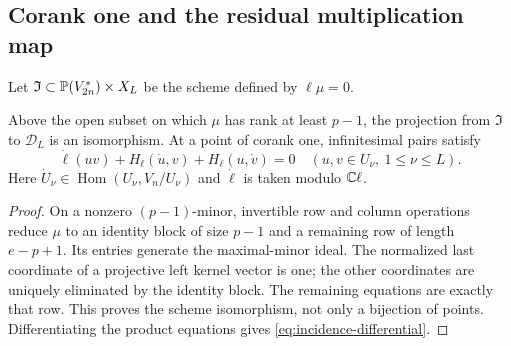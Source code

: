 \subsection{Corank one and the residual multiplication map}
Let $\mathfrak I\subset\mathbb P(V_{2n}^*)\times X_L$ be the scheme defined by $\ell\mu=0$.
\begin{lemma}\label{lem:incidence-chart}
Above the open subset on which $\mu$ has rank at least $p-1$, the projection from $\mathfrak I$ to $\mathscr D_L$ is an isomorphism. At a point of corank one, infinitesimal pairs satisfy
\begin{equation}\label{eq:incidence-differential}
 \dot\ell(uv)+H_\ell(\dot u,v)+H_\ell(u,\dot v)=0
       \quad(u,v\in U_\nu,\ 1\le\nu\le L).
\end{equation}
Here $\dot U_\nu\in\operatorname{Hom}(U_\nu,V_n/U_\nu)$ and $\dot\ell$ is taken modulo $\mathbb C\ell$.
\end{lemma}
\begin{proof}
On a nonzero $(p-1)$-minor, invertible row and column operations reduce $\mu$ to an identity block of size $p-1$ and a remaining row of length $e-p+1$. Its entries generate the maximal-minor ideal. The normalized last coordinate of a projective left kernel vector is one; the other coordinates are uniquely eliminated by the identity block. The remaining equations are exactly that row. This proves the scheme isomorphism, not only a bijection of points. Differentiating the product equations gives \eqref{eq:incidence-differential}.
\end{proof}

